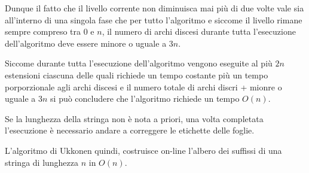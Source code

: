 Dunque il fatto che il livello corrente non diminuisca mai più di due volte vale sia all'interno di una singola fase che per tutto l'algoritmo e siccome il livello rimane sempre compreso tra 0 e $n$, il numero di archi discesi durante tutta l'esecuzione dell'algoritmo deve essere minore o uguale a $3n$.

Siccome durante tutta l'esecuzione dell'algoritmo vengono eseguite al più $2n$ estensioni ciascuna delle quali richiede un tempo costante più un tempo porporzionale agli archi discesi e il numero totale di archi discri + mionre o uguale a $3n$ si può concludere che l'algoritmo richiede un tempo $O(n)$.

Se la lunghezza della stringa non è nota a priori, una volta completata l'esecuzione è necessario andare a correggere le etichette delle foglie.

L'algoritmo di Ukkonen quindi, costruisce on-line l'albero dei suffissi di una stringa di lunghezza $n$ in $O(n)$.